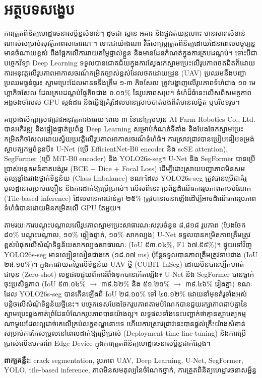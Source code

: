 \clearpage
{}
\chapter*{{\khmoul អត្ថបទសង្ខេប}}

\begin{khmer}

\hs ការត្រួតពិនិត្យហេដ្ឋារចនាសម្ព័ន្ធសំខាន់ៗ ដូចជា ស្ពាន អគារ និងផ្លូវរត់យន្តហោះ មានសារៈសំខាន់ណាស់សម្រាប់សុវត្ថិភាពសាធារណៈ។ ទោះជាយ៉ាងណា វិធីសាស្ត្រត្រួតពិនិត្យដោយដៃនាពេលបច្ចុប្បន្នមានចំណាយខ្ពស់ ពឹងផ្អែកលើការវាយតម្លៃផ្ទាល់ខ្លួន និងមានដែនកំណត់ក្នុងការគ្របដណ្តប់។ ទោះបីជាបច្ចេកវិទ្យា Deep Learning ទទួលបានជោគជ័យក្នុងការស្វែងរកស្នាមប្រេះលើរូបភាពថតជិតក៏ដោយ ការអនុវត្តលើរូបភាពអាកាសចរណ៍កម្រិតច្បាស់ខ្ពស់ដែលថតដោយដ្រូន (UAV) ប្រឈមនឹងបញ្ហាប្រឈមធ្ងន់ធ្ងរ៖ ស្នាមប្រេះដែលមានទទឹងត្រឹម ១-៣ ភិចសែល ត្រូវបង្ហាញលើរូបភាពទំហំជាង ១០ មេហ្គាភិចសែល ដែលគ្របដណ្តប់ផ្ទៃតិចជាង ០.០១\% នៃរូបភាពសរុប។ ទំហំដ៏ធំនេះលើសពីសមត្ថភាពអង្គចងចាំរបស់ GPU ស្តង់ដារ និងធ្វើឱ្យគំរូដែលមានស្រាប់បាត់បង់ព័ត៌មានលម្អិត ឬបរិបទរួម។

\hs គម្រោងសិក្សាស្រាវជ្រាវអនុវត្តការងាររយៈពេល ៣ ខែនៅក្រុមហ៊ុន AI Farm Robotics Co., Ltd. បានអភិវឌ្ឍ និងផ្ទៀងផ្ទាត់ប្រព័ន្ធ Deep Learning សម្រាប់កំណត់ទីតាំង និងបែងចែកស្នាមប្រេះកម្រិតភិចសែលដោយស្វ័យប្រវត្តិលើរូបភាពអាកាសចរណ៍ទំហំធំ។ ការស្រាវជ្រាវបានប្រៀបធៀបទម្រង់ស្ថាបត្យកម្មចំនួនបី៖ U-Net (ប្រើ EfficientNet-B0 encoder និង scSE attention), SegFormer (ប្រើ MiT-B0 encoder) និង YOLO26s-seg។ U-Net និង SegFormer បានប្រើប្រាស់អនុគមន៍ខាតបង់រួម (BCE + Dice + Focal Loss) ដើម្បីដោះស្រាយបញ្ហាភាពមិនសមតុល្យខ្លាំងរវាងថ្នាក់ទិន្នន័យ (Class Imbalance) ខណៈដែល YOLO26s-seg ត្រូវបានប្រើជាគំរូមូលដ្ឋានសម្រាប់ល្បឿន និងការដាក់ឱ្យប្រើប្រាស់។ លើសពីនេះ ប្រព័ន្ធដំណើរការរូបភាពតាមបំណែក (Tile-based inference) ដែលមានការជាន់គ្នា ២៥\% ត្រូវបានរចនាឡើងដើម្បីអាចដំណើរការរូបភាពទំហំធំបានដោយមិនកម្រិតលើ GPU តែមួយ។

\hs តាមរយៈការបណ្តុះបណ្តាលលើរូបភាពស្នាមប្រេះសាធារណៈសរុបចំនួន ៨,៨១៨ រូបភាព (បែងចែក ៨០\% បណ្តុះបណ្តាល, ១០\% ផ្ទៀងផ្ទាត់, ១០\% សាកល្បង) U-Net ទទួលបានកម្រិតភាពត្រឹមត្រូវខ្ពស់បំផុតលើសំណុំទិន្នន័យសាកល្បងសាធារណៈ (IoU ៥៣.០៤\%, F1 ៦៧.៥៩\%)។ ផ្ទុយទៅវិញ YOLO26s-seg មានល្បឿនលឿនជាងគេ (១៨.០៧ ms) ប៉ុន្តែទទួលបានភាពត្រឹមត្រូវទាបជាង (IoU ២៨.១០\%)។ ក្នុងការវាយតម្លៃលើទិន្នន័យ UAV ថ្មី (CUBIT-InSeg) ដោយមិនបានហ្វឹកហាត់ជាមុន (Zero-shot) លទ្ធផលផ្ទុយពីការរំពឹងទុកបានកើតឡើង៖ U-Net និង SegFormer បានធ្លាក់ចុះប្រសិទ្ធភាព (IoU ៥៣.០៤\% $\rightarrow$ ៣៩.៦២\% និង ៥១.២១\% $\rightarrow$ ៣៩.៤៦\% រៀងគ្នា) ខណៈដែល YOLO26s-seg បានកើនឡើងពី IoU ២៨.១០\% ទៅ ៤០.១២\% ដោយនាំមុខគំរូទាំងអស់បន្តិចលើសំណុំទិន្នន័យថ្មីនេះ។ បច្ចេកទេសបែងចែករូបភាពតាមបំណែកបានជួយរក្សាភាពជាប់គ្នានៃស្នាមប្រេះឆ្លងកាត់ព្រំដែនបំណែករូបភាពបានយ៉ាងល្អ។ លទ្ធផលទាំងនេះបញ្ជាក់ថាគ្មានស្ថាបត្យកម្មណាមួយដែលល្អដាច់គេលើគ្រប់លក្ខខណ្ឌនោះទេ ហើយការស្រាវជ្រាវនេះបានផ្តល់គ្រឹះយ៉ាងសំខាន់សម្រាប់ការកែសម្រួលនៅពេលដាក់ឱ្យប្រើប្រាស់ (Deployment-time fine-tuning) និងការប្រើប្រាស់លើឧបករណ៍ Edge Device ក្នុងការត្រួតពិនិត្យហេដ្ឋារចនាសម្ព័ន្ធជាក់ស្តែង។ 

\vspace{0.5cm}
\noindent\textbf{ពាក្យគន្លឹះ:} crack segmentation, រូបភាព UAV, Deep Learning, U-Net, SegFormer, YOLO,  tile-based inference, ភាពមិនសមតុល្យនៃចំណែកថ្នាក់, ការត្រួតពិនិត្យហេដ្ឋារចនាសម្ព័ន្ធ

\end{khmer}